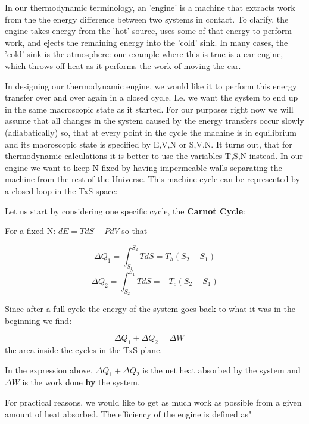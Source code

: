\documentclass{article}
\begin{document}
In our thermodynamic terminology, an 'engine' is a machine that extracts work from the the energy difference between two systems in contact.  To clarify, the engine takes energy from the 'hot' source, uses some of that energy to perform work, and ejects the remaining energy into the 'cold' sink.  In many cases, the 'cold' sink is the atmosphere: one example where this is true is a car engine, which throws off heat as it performs the work of moving the car.  

In designing our thermodynamic engine, we would like it to perform this energy transfer over and over again in a closed cycle.  I.e. we want the system to end up in the same macroscopic state as it started.  For our purposes right now we will assume that all changes in the system caused by the energy transfers occur slowly (adiabatically) so, that at every point in the cycle the machine is in equilibrium and its macroscopic state is specified by E,V,N or S,V,N.  It turns out, that for thermodynamic calculations it is better to use the variables T,S,N instead.  In our engine we want to keep N fixed by having impermeable walls separating the machine from the rest of the Universe.  This machine cycle can be represented by a closed loop in the TxS space:


Let us start by considering one specific cycle, the \textbf{Carnot Cycle}:



For a fixed N: $dE=TdS-PdV$ so that 

$$\Delta Q_{1}=\int_{S_{1}}^{S_{2}}TdS=T_{h}(S_{2}-S_{1})$$
$$\Delta Q_{2}=\int_{S_{2}}^{S_{1}}TdS=-T_{c}(S_{2}-S_{1})$$


Since after a full cycle the energy of the system goes back to what it was in the beginning we find:

$$\Delta Q_{1}+\Delta Q_{2}=\Delta W=$$ the area inside the cycles in the TxS plane.

In the expression above, $\Delta Q_{1}+\Delta Q_{2}$ is the net heat absorbed by the system and $\Delta W$ is the work done \textbf{by} the system.  


For practical reasons, we would like to get as much work as possible from a given amount of heat absorbed.  The efficiency of the engine is defined as"
\end{document}
